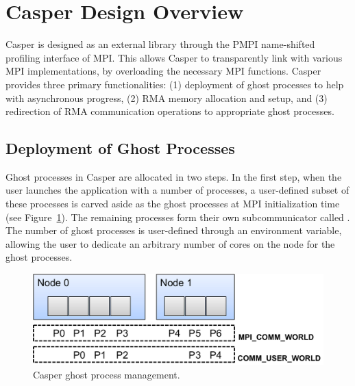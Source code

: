 \section{Casper Design Overview}\label{sec:design}

Casper is designed as an external library through the PMPI
name-shifted profiling interface of MPI.  This allows Casper to
transparently link with various MPI implementations, by overloading
the necessary MPI functions.  Casper provides three primary
functionalities: (1) deployment of ghost processes to help with
asynchronous progress, (2) RMA memory allocation and setup, and (3)
redirection of RMA communication operations to appropriate ghost
processes.


\subsection{Deployment of Ghost Processes}\label{sec:des-pe}

Ghost processes in Casper are allocated in two steps.  In the
first step, when the user launches the application with a number of
processes, a user-defined subset of these processes is carved aside
as the ghost processes at MPI initialization time (see
Figure~\ref{fig:deg-user-comm}).  The remaining processes form their
own subcommunicator called .  The number of
ghost processes is user-defined through an environment variable,
allowing the user to dedicate an arbitrary number of cores on the
node for the ghost processes.

\begin{figure}[htbp]
\centering
\includegraphics[width=0.9\columnwidth]{figures/casper/design_user_comm.pdf}
\caption{Casper ghost process management.}
\label{fig:deg-user-comm}
\end{figure}


